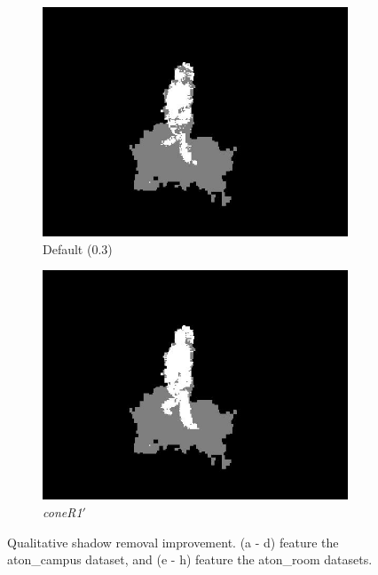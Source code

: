 \documentclass[12pt]{report}
\begin{document}
\begin{figure}
\begin{subfigure}{.24\linewidth}
  \includegraphics[width=1\linewidth]{figures/model/room_0275_default.jpg}
  \caption{Default (0.3)}
  \end{subfigure}
  \hfill
  \begin{subfigure}{.24\linewidth}
  \includegraphics[width=1\linewidth]{figures/model/room_0275_calc.jpg}
  \caption{\textit{coneR1}$'$}
  \end{subfigure}
  
\caption{Qualitative shadow removal improvement. (a - d) feature the aton\_campus dataset, and (e - h) feature the aton\_room datasets.}
\label{fig:qual_results}
\end{figure} 
\end{document}
